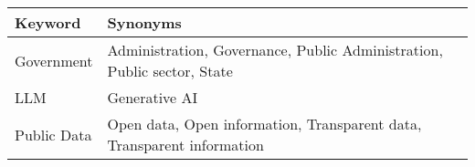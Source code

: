 \begin{table}
\small
\centering
\begin{tabular}{|p{2.5cm}|p{6cm}|}
\hline
\textbf{Keyword} & \textbf{Synonyms} \\
\hline
Government & Administration, Governance, Public Administration, Public sector, State \\
\hline
LLM & Generative AI \\
\hline
Public Data & Open data, Open information, Transparent data, Transparent information \\
\hline
\end{tabular}
\end{table}